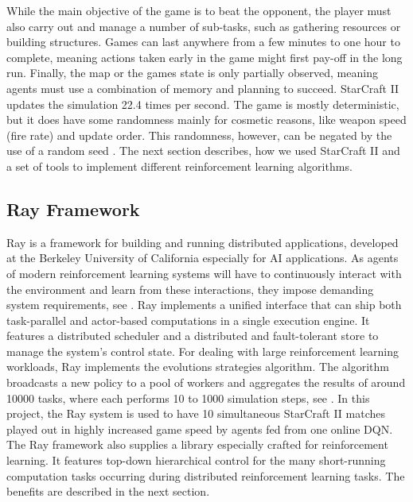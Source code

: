 \documentclass[12pt,a4paper]{article}
\begin{document}
While the main objective of the game is to beat the opponent, the player must also carry out and manage a number of sub-tasks, such as gathering resources or building structures. Games can last anywhere from a few minutes to one hour to complete, meaning actions taken early in the game might first pay-off in the long run. Finally, the map or the games state is only partially observed, meaning agents must use a combination of memory and planning to succeed.
StarCraft II updates the simulation 22.4 times per second. The game is mostly deterministic, but it does have some randomness mainly for cosmetic reasons, like weapon speed (fire rate) and update order. This randomness, however, can be negated by the use of a random seed \cite{DBLP:journals/corr/abs-1708-04782}.
The next section describes, how we used StarCraft II and a set of tools to implement different reinforcement learning algorithms.
\subsection{Ray Framework}
Ray is a framework for building and running distributed applications, developed at the Berkeley University of California especially for AI applications. As agents of modern reinforcement learning systems will have to continuously interact with the environment and learn from these interactions, they impose demanding system requirements, see \cite{Moritz2017}. Ray implements a unified interface that can ship both task-parallel and actor-based computations in a single execution engine.
It features a distributed scheduler and a distributed and fault-tolerant store to manage the system's control state.
For dealing with large reinforcement learning workloads, Ray implements the evolutions strategies algorithm. The algorithm broadcasts a new policy to a pool of workers and aggregates the results of around 10000 tasks, where each performs 10 to 1000 simulation steps, see \cite{Moritz2017}.
In this project, the Ray system is used to have 10 simultaneous StarCraft II matches played out in highly increased game speed by agents fed from one online DQN.
The Ray framework also supplies a library especially crafted for reinforcement learning. It features top-down hierarchical control for the many short-running computation tasks occurring during distributed reinforcement learning tasks. The benefits are described in the next section.
\end{document}
